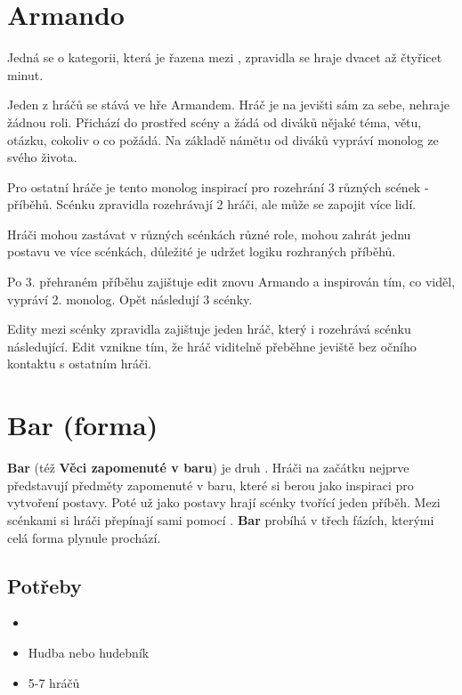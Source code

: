 \documentclass[main.tex]{subfiles}
\begin{document}
\needspace{5cm} \section{Armando} \label{armando} Jedná se o kategorii, která je řazena mezi , zpravidla se hraje dvacet až čtyřicet minut. 
 
Jeden z hráčů se stává ve hře Armandem. Hráč je na jevišti sám za sebe, nehraje žádnou roli. Přichází do prostřed scény a žádá od diváků nějaké téma, větu, otázku, cokoliv o co požádá. 
Na základě námětu od diváků vypráví monolog ze svého života. 
 
Pro ostatní hráče je tento monolog inspirací pro rozehrání 3 různých scének - příběhů. Scénku zpravidla rozehrávají 2 hráči, ale může se zapojit více lidí. 
 
Hráči mohou zastávat v různých scénkách různé role, mohou zahrát jednu postavu ve více scénkách, důležité je udržet logiku rozhraných příběhů. 
 
Po 3. přehraném příběhu zajištuje edit znovu Armando a inspirován tím, co viděl, vypráví 2. monolog. Opět následují 3 scénky. 
 
Edity mezi scénky zpravidla zajištuje jeden hráč, který i rozehrává scénku následující. Edit vznikne tím, že hráč viditelně přeběhne jeviště bez očního kontaktu s ostatním hráči. 
 
 
\needspace{5cm} \section{Bar (forma)} \label{bar (forma)} \textbf{Bar}{}  (též \textbf{Věci zapomenuté v baru}{}) je druh . Hráči na začátku nejprve představují předměty zapomenuté v baru, které si berou jako inspiraci pro vytvoření postavy. Poté už jako postavy hrají scénky tvořící jeden příběh. Mezi scénkami si hráči přepínají sami pomocí . \textbf{Bar}{} probíhá v třech fázích, kterými celá forma plynule prochází. 
 
\subsection{ Potřeby } \begin{itemize}
\item  {}
\item  Hudba nebo hudebník
\item  5-7 hráčů
\end{itemize}
 
\end{document}
